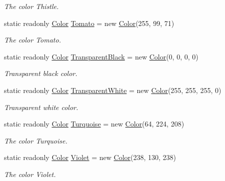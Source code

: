 \begin{DoxyCompactItemize}
\begin{DoxyCompactList}\small\item\em The color Thistle. \end{DoxyCompactList}\item 
static readonly \hyperlink{struct_tri_devs_1_1_tri_engine_1_1_color}{Color} \hyperlink{struct_tri_devs_1_1_tri_engine_1_1_color_add4736c87756a59520f41ac63512c38a}{Tomato} = new \hyperlink{struct_tri_devs_1_1_tri_engine_1_1_color}{Color}(255, 99, 71)
\begin{DoxyCompactList}\small\item\em The color Tomato. \end{DoxyCompactList}\item 
static readonly \hyperlink{struct_tri_devs_1_1_tri_engine_1_1_color}{Color} \hyperlink{struct_tri_devs_1_1_tri_engine_1_1_color_a435d7e368cb42f983118cb46ef4390ab}{Transparent\-Black} = new \hyperlink{struct_tri_devs_1_1_tri_engine_1_1_color}{Color}(0, 0, 0, 0)
\begin{DoxyCompactList}\small\item\em Transparent black color. \end{DoxyCompactList}\item 
static readonly \hyperlink{struct_tri_devs_1_1_tri_engine_1_1_color}{Color} \hyperlink{struct_tri_devs_1_1_tri_engine_1_1_color_aa1b8bd27f2db1799a960c9aaad61beb7}{Transparent\-White} = new \hyperlink{struct_tri_devs_1_1_tri_engine_1_1_color}{Color}(255, 255, 255, 0)
\begin{DoxyCompactList}\small\item\em Transparent white color. \end{DoxyCompactList}\item 
static readonly \hyperlink{struct_tri_devs_1_1_tri_engine_1_1_color}{Color} \hyperlink{struct_tri_devs_1_1_tri_engine_1_1_color_a354499271455e7bec9795153b805bbc9}{Turquoise} = new \hyperlink{struct_tri_devs_1_1_tri_engine_1_1_color}{Color}(64, 224, 208)
\begin{DoxyCompactList}\small\item\em The color Turquoise. \end{DoxyCompactList}\item 
static readonly \hyperlink{struct_tri_devs_1_1_tri_engine_1_1_color}{Color} \hyperlink{struct_tri_devs_1_1_tri_engine_1_1_color_ad6774e5a8fd5956000ba8dd22a404839}{Violet} = new \hyperlink{struct_tri_devs_1_1_tri_engine_1_1_color}{Color}(238, 130, 238)
\begin{DoxyCompactList}\small\item\em The color Violet. \end{DoxyCompactList}\item 

\end{DoxyCompactItemize}
